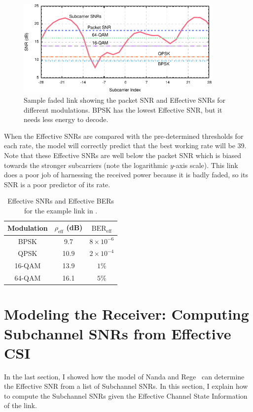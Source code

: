\begin{figure}[t]
  \centering
  \includegraphics[width=0.9\textwidth]{figures/eff_snr_example.pdf}
  \caption[Packet SNR and Effective SNRs for a sample faded link]{Sample faded link showing the packet SNR and Effective SNRs for different modulations. BPSK has the lowest Effective SNR, but it needs less energy to decode.}
  \label{fig:eff_example}
\end{figure}

When the Effective SNRs are compared with the pre-determined thresholds for each rate, the model will correctly predict that the best working rate will be 39\Mbps. Note that these Effective SNRs are well below the packet SNR which is biased towards the stronger subcarriers (note the logarithmic $y$-axis scale). This link does a poor job of harnessing the received power because it is badly faded, so its SNR is a poor predictor of its rate.

\begin{table}[t]
	\centering
	\begin{tabular}{ccc}
	\toprule%
	Modulation & $\rho_\text{eff}$ (dB) & $\text{BER}_\text{eff}$\\
	\midrule%
	BPSK   &  9.7 & $8\times10^{-6}$\\
	QPSK   & 10.9 & $2\times10^{-4}$\\
	16-QAM & 13.9 & $1\%$\\
	64-QAM & 16.1 & $5\%$\\
	\bottomrule
	\end{tabular}
	\caption{\label{tab:example_bers}Effective SNRs and Effective BERs for the example link in .}
\end{table}

\section{Modeling the Receiver: Computing Subchannel SNRs from Effective CSI}
In the last section, I showed how the model of Nanda and Rege~\cite{Nanda_EffectiveSNR} can determine the Effective SNR from a list of Subchannel SNRs. In this section, I explain how to compute the Subchannel SNRs given the Effective Channel State Information of the link.


